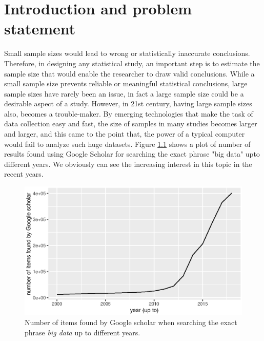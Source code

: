 \documentclass[11pt,a5paper,twoside]{book}
\newcommand{\clearemptydoublepage}%
        {\newpage{\pagestyle{empty}\cleardoublepage}}
\begin{document}
\pagestyle{fancy}

 \frontmatter
 
 \thispagestyle{empty}
\tableofcontents
\listoffigures
\listoftables


\clearemptydoublepage
\mainmatter

\clearemptydoublepage

\chapter[Introduction]{Introduction and problem statement}
\label{sec_intro1}

Small sample sizes would lead to wrong or statistically inaccurate conclusions. Therefore, in designing any statistical study, an important step is to estimate the sample size that would enable the researcher to draw valid conclusions. While a small sample size prevents reliable or meaningful statistical conclusions, large sample sizes have rarely been an issue, in fact a large sample size could be a desirable aspect of a study. However, in 21st century, having large sample sizes also, becomes a trouble-maker. By emerging technologies that make the task of data collection easy and fast, the size of samples in many studies becomes larger and larger, and this came to the point that, the power of a typical computer would fail to analyze such huge datasets. Figure \ref{fig_bigdata} shows a plot of number of results found using Google Scholar for searching the exact phrase "big data" upto different years. We obviously can see the increasing interest in this topic in the recent years.




\begin{figure}
\centering
\includegraphics[width=\textwidth]{bigdata.eps}
\caption{Number of items found by Google scholar when searching the exact phrase \emph{big data} up to different years.} 
\label{fig_bigdata}
\end{figure} 
\end{document}
